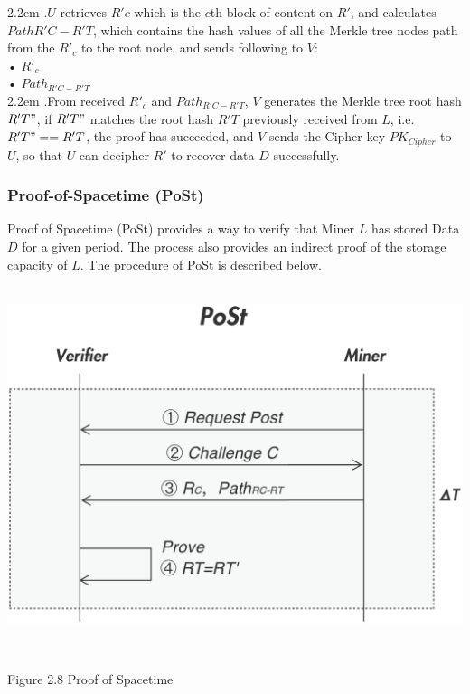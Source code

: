 \documentclass[10pt,a4paper]{article}
\begin{document}
\hangindent 2.2em
.\quad $U$ retrieves $R'{c}$ which is the ${c}$th block of content on $R'$, and calculates $Path{R'C-R'T}$, which contains the hash values of all the Merkle tree nodes path from the $R'_{c}$ to the root node, and sends following to $V$:
\\
    •  $R'_{c}$ \\
   •  $Path_{R'C-R'T}$
    \vspace{-0.5em}
\\

\hangindent 2.2em
.\quad From received $R'_{c}$ and $Path_{R'C-R'T}$, $V$ generates the Merkle tree root hash $R'T"$, if $R'T"$ matches the root hash $R'T$ previously received from $L$, i.e. $R'T" == R'T$, the proof has succeeded, and $V$ sends the Cipher key $PK_{Cipher}$ to $U$, so that $U$ can decipher $R'$ to recover data $D$ successfully.
\vspace{-0.5em}

        \subsubsection{Proof-of-Spacetime (PoSt)}  %
Proof of Spacetime (PoSt) provides a way to verify that Miner $L$ has stored Data $D$ for a given period. The process also provides an indirect proof of the storage capacity of $L$. The procedure of PoSt is described below.
\vspace{-0.5em}
\\ \\
\centerline{\includegraphics[width=380pt]{fig8}}
 \\\centerline{{Figure 2.8 Proof of Spacetime}}
 \vspace{-1.5em}
\\
\end{document}
